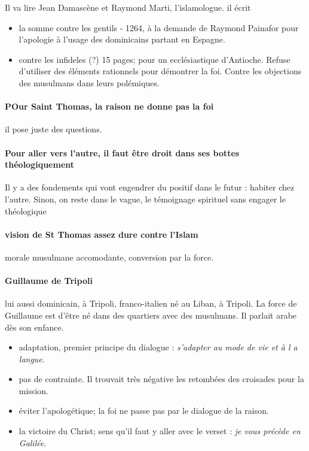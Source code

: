 Il va lire Jean Damascène et Raymond Marti, l'islamologue.
il écrit
\begin{itemize}
    \item la somme contre les gentils - 1264, à la demande de Raymond Painafor pour l’apologie à l'usage des dominicains partant en Espagne.
    \item contre les infideles (?) 15 pages; pour un ecclésiastique d'Antioche.  Refuse d'utiliser des éléments rationnels pour démontrer la foi. Contre les objections des musulmans dans leurs polémiques. 
    
\end{itemize}

\paragraph{POur Saint Thomas, la raison ne donne pas la foi} il pose juste des questions. 


\paragraph{Pour aller vers l’autre, il faut être droit dans ses bottes théologiquement}


Il y a des fondements qui vont engendrer du positif dans le futur : habiter chez l’autre. 
Sinon, on reste dans le vague, le témoignage spirituel sans engager le théologique

\paragraph{vision de St Thomas assez dure contre l'Islam} morale musulmane accomodante, conversion par la force. 

\paragraph{Guillaume de Tripoli} lui aussi dominicain, à Tripoli, franco-italien né au Liban, à Tripoli. La force de Guillaume est d'être né dans des quartiers avec des musulmans. Il parlait arabe dès son enfance.
\begin{itemize}
    \item adaptation, premier principe du dialogue : \textit{s'adapter au mode de vie et à l a langue}.
    \item pas de contrainte.  Il trouvait très négative les retombées des croisades pour la mission. 
    \item éviter l'apologétique; la foi ne passe pas par le dialogue de la raison.
    \item la victoire du Christ; sens qu'il faut y aller avec le verset : \textit{je vous précède en Galilée}. 
\end{itemize}

